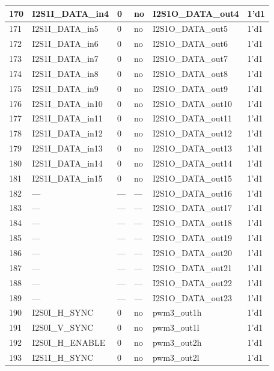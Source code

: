 \begin{longtable}[c]{|p{1cm}|p{3.3cm}|p{1.5cm}|p{2.4cm}|p{4.3cm}|p{2.5cm}| }
    170 & I2S1I\_DATA\_in4 & 0 & no & I2S1O\_DATA\_out4 & 1'd1 \\ \hline
    171 & I2S1I\_DATA\_in5 & 0 & no & I2S1O\_DATA\_out5 & 1'd1 \\ \hline
    172 & I2S1I\_DATA\_in6 & 0 & no & I2S1O\_DATA\_out6 & 1'd1 \\ \hline
    173 & I2S1I\_DATA\_in7 & 0 & no & I2S1O\_DATA\_out7 & 1'd1 \\ \hline
    174 & I2S1I\_DATA\_in8 & 0 & no & I2S1O\_DATA\_out8 & 1'd1 \\ \hline
    175 & I2S1I\_DATA\_in9 & 0 & no & I2S1O\_DATA\_out9 & 1'd1 \\ \hline
    176 & I2S1I\_DATA\_in10 & 0 & no & I2S1O\_DATA\_out10 & 1'd1 \\ \hline
    177 & I2S1I\_DATA\_in11 & 0 & no & I2S1O\_DATA\_out11 & 1'd1 \\ \hline
    178 & I2S1I\_DATA\_in12 & 0 & no & I2S1O\_DATA\_out12 & 1'd1 \\ \hline
    179 & I2S1I\_DATA\_in13 & 0 & no & I2S1O\_DATA\_out13 & 1'd1 \\ \hline
    180 & I2S1I\_DATA\_in14 & 0 & no & I2S1O\_DATA\_out14 & 1'd1 \\ \hline
    181 & I2S1I\_DATA\_in15 & 0 & no & I2S1O\_DATA\_out15 & 1'd1 \\ \hline
    182 & --- & --- & --- & I2S1O\_DATA\_out16 & 1'd1 \\ \hline
    183 & --- & --- & --- & I2S1O\_DATA\_out17 & 1'd1 \\ \hline
    184 & --- & --- & --- & I2S1O\_DATA\_out18 & 1'd1 \\ \hline
    185 & --- & --- & --- & I2S1O\_DATA\_out19 & 1'd1 \\ \hline
    186 & --- & --- & --- & I2S1O\_DATA\_out20 & 1'd1 \\ \hline
    187 & --- & --- & --- & I2S1O\_DATA\_out21 & 1'd1 \\ \hline
    188 & --- & --- & --- & I2S1O\_DATA\_out22 & 1'd1 \\ \hline
    189 & --- & --- & --- & I2S1O\_DATA\_out23 & 1'd1 \\ \hline
    190 & I2S0I\_H\_SYNC & 0 & no & pwm3\_out1h & 1'd1 \\ \hline
    191 & I2S0I\_V\_SYNC & 0 & no & pwm3\_out1l & 1'd1 \\ \hline
    192 & I2S0I\_H\_ENABLE & 0 & no & pwm3\_out2h & 1'd1 \\ \hline
    193 & I2S1I\_H\_SYNC & 0 & no & pwm3\_out2l & 1'd1 \\ \hline

\end{longtable}
